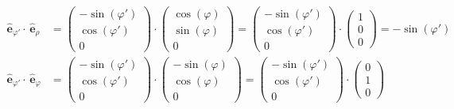 \begin{align}
  \hat{\mathbf{e}}_{\varphi'} \cdot \,\hat{\mathbf{e}}_\rho    &= \begin{pmatrix} -\sin(\varphi') \\ \cos(\varphi') \\ 0 \end{pmatrix}
                                                                  \cdot
                                                                  \begin{pmatrix}  \cos(\varphi ) \\ \sin(\varphi ) \\ 0 \end{pmatrix}
                                                                = \begin{pmatrix} -\sin(\varphi') \\ \cos(\varphi') \\ 0 \end{pmatrix}
                                                                  \cdot
                                                                  \begin{pmatrix}  1 \\ 0 \\ 0 \end{pmatrix}
                                                                = -\sin(\varphi') \\
  \hat{\mathbf{e}}_{\varphi'} \cdot \,\hat{\mathbf{e}}_\varphi &= \begin{pmatrix} -\sin(\varphi') \\ \cos(\varphi') \\ 0 \end{pmatrix}
                                                                  \cdot
                                                                  \begin{pmatrix} -\sin(\varphi ) \\ \cos(\varphi ) \\ 0 \end{pmatrix}
                                                                = \begin{pmatrix} -\sin(\varphi') \\ \cos(\varphi') \\ 0 \end{pmatrix}
                                                                  \cdot
                                                                  \begin{pmatrix}  0 \\ 1 \\ 0 \end{pmatrix}

\end{align}
